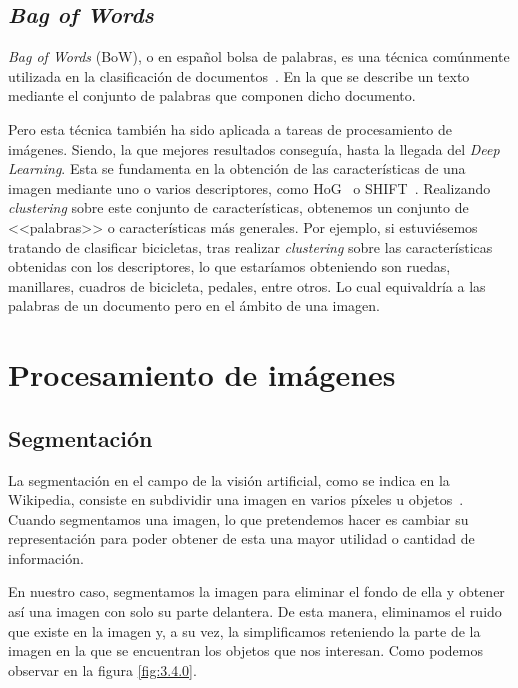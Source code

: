 \subsection{\textit{Bag of Words}}

\textit{Bag of Words} (BoW), o en español bolsa de palabras, es una técnica comúnmente utilizada en la clasificación de documentos~\cite{wiki:bowmodel}. En la que se describe un texto mediante el conjunto de palabras que componen dicho documento.

Pero esta técnica también ha sido aplicada a tareas de procesamiento de imágenes. Siendo, la que mejores resultados conseguía, hasta la llegada del \textit{Deep Learning}. Esta se fundamenta en la obtención de las características de una imagen mediante uno o varios descriptores, como HoG~\cite{wiki:hog} o SHIFT~\cite{shift}. Realizando \textit{clustering} sobre este conjunto de características, obtenemos un conjunto de <<palabras>> o características más generales. Por ejemplo, si estuviésemos tratando de  clasificar bicicletas, tras realizar \textit{clustering} sobre las características obtenidas con los descriptores, lo que estaríamos obteniendo son ruedas, manillares, cuadros de bicicleta, pedales, entre otros. Lo cual equivaldría a las palabras de un documento pero en el ámbito de una imagen.

\section{Procesamiento de imágenes}

\subsection{Segmentación}

La segmentación en el campo de la visión artificial, como se indica en la Wikipedia, consiste en subdividir una imagen en varios píxeles u objetos~\cite{wiki:segmentation}. Cuando segmentamos una imagen, lo que pretendemos hacer es cambiar su representación para poder obtener de esta una mayor utilidad o cantidad de información.

En nuestro caso, segmentamos la imagen para eliminar el fondo de ella y obtener así una imagen con solo su parte delantera. De esta manera, eliminamos el ruido que existe en la imagen y, a su vez, la simplificamos reteniendo la parte de la imagen en la que se encuentran los objetos que nos interesan. Como podemos observar en la figura \ref{fig:3.4.0}.

